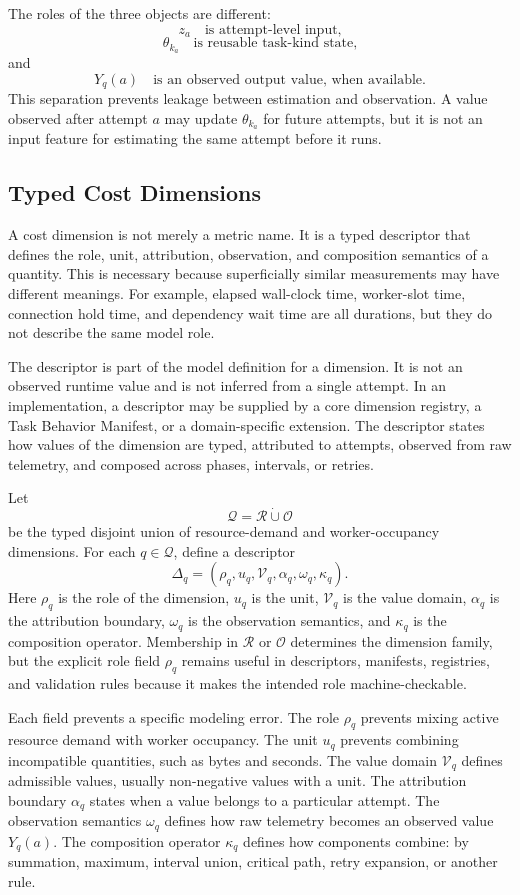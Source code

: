 The roles of the three objects are different:
\[
z_a
\quad \text{is attempt-level input,}
\]
\[
\theta_{k_a}
\quad \text{is reusable task-kind state,}
\]
and
\[
Y_q(a)
\quad \text{is an observed output value, when available.}
\]
This separation prevents leakage between estimation and observation. A value
observed after attempt $a$ may update $\theta_{k_a}$ for future attempts, but it
is not an input feature for estimating the same attempt before it runs.

\subsection{Typed Cost Dimensions}
\label{sec:cost-typed-dimensions}

A cost dimension is not merely a metric name. It is a typed descriptor that
defines the role, unit, attribution, observation, and composition semantics of a
quantity. This is necessary because superficially similar measurements may have
different meanings. For example, elapsed wall-clock time, worker-slot time,
connection hold time, and dependency wait time are all durations, but they do
not describe the same model role.

The descriptor is part of the model definition for a dimension. It is not an
observed runtime value and is not inferred from a single attempt. In an
implementation, a descriptor may be supplied by a core dimension registry, a
Task Behavior Manifest, or a domain-specific extension. The descriptor states
how values of the dimension are typed, attributed to attempts, observed from raw
telemetry, and composed across phases, intervals, or retries.

Let
\[
\mathcal{Q}
=
\mathcal{R}
\dot{\cup}
\mathcal{O}
\]
be the typed disjoint union of resource-demand and worker-occupancy dimensions.
For each $q \in \mathcal{Q}$, define a descriptor
\[
\Delta_q
=
\left(
\rho_q,
u_q,
\mathcal{V}_q,
\alpha_q,
\omega_q,
\kappa_q
\right).
\]
Here $\rho_q$ is the role of the dimension, $u_q$ is the unit,
$\mathcal{V}_q$ is the value domain, $\alpha_q$ is the attribution boundary,
$\omega_q$ is the observation semantics, and $\kappa_q$ is the composition
operator. Membership in $\mathcal{R}$ or $\mathcal{O}$ determines the dimension
family, but the explicit role field $\rho_q$ remains useful in descriptors,
manifests, registries, and validation rules because it makes the intended role
machine-checkable.

Each field prevents a specific modeling error. The role $\rho_q$ prevents
mixing active resource demand with worker occupancy. The unit $u_q$ prevents
combining incompatible quantities, such as bytes and seconds. The value domain
$\mathcal{V}_q$ defines admissible values, usually non-negative values with a
unit. The attribution boundary $\alpha_q$ states when a value belongs to a
particular attempt. The observation semantics $\omega_q$ defines how raw
telemetry becomes an observed value $Y_q(a)$. The composition operator
$\kappa_q$ defines how components combine: by summation, maximum, interval
union, critical path, retry expansion, or another rule.

